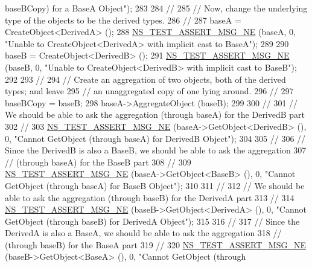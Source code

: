 \begin{DoxyCode}
{       baseBCopy) for a BaseA Object"});
283 
284   \textcolor{comment}{//}
285   \textcolor{comment}{// Now, change the underlying type of the objects to be the derived types.}
286   \textcolor{comment}{//}
287   baseA = CreateObject<DerivedA> ();
288   \hyperlink{group__testing_ga73d66fb0050a5111453fd144e767b91a}{NS\_TEST\_ASSERT\_MSG\_NE} (baseA, 0, \textcolor{stringliteral}{"Unable to CreateObject<DerivedA> with implicit
       cast to BaseA"});
289 
290   baseB = CreateObject<DerivedB> ();
291   \hyperlink{group__testing_ga73d66fb0050a5111453fd144e767b91a}{NS\_TEST\_ASSERT\_MSG\_NE} (baseB, 0, \textcolor{stringliteral}{"Unable to CreateObject<DerivedB> with implicit
       cast to BaseB"});
292 
293   \textcolor{comment}{//}
294   \textcolor{comment}{// Create an aggregation of two objects, both of the derived types; and leave}
295   \textcolor{comment}{// an unaggregated copy of one lying around.}
296   \textcolor{comment}{//}
297   baseBCopy = baseB;
298   baseA->AggregateObject (baseB);
299 
300   \textcolor{comment}{//}
301   \textcolor{comment}{// We should be able to ask the aggregation (through baseA) for the DerivedB part}
302   \textcolor{comment}{//}
303   \hyperlink{group__testing_ga73d66fb0050a5111453fd144e767b91a}{NS\_TEST\_ASSERT\_MSG\_NE} (baseA->GetObject<DerivedB> (), 0, \textcolor{stringliteral}{"Cannot GetObject (through
       baseA) for DerivedB Object"});
304 
305   \textcolor{comment}{//}
306   \textcolor{comment}{// Since the DerivedB is also a BaseB, we should be able to ask the aggregation }
307   \textcolor{comment}{// (through baseA) for the BaseB part}
308   \textcolor{comment}{//}
309   \hyperlink{group__testing_ga73d66fb0050a5111453fd144e767b91a}{NS\_TEST\_ASSERT\_MSG\_NE} (baseA->GetObject<BaseB> (), 0, \textcolor{stringliteral}{"Cannot GetObject (through
       baseA) for BaseB Object"});
310 
311   \textcolor{comment}{//}
312   \textcolor{comment}{// We should be able to ask the aggregation (through baseB) for the DerivedA part}
313   \textcolor{comment}{//}
314   \hyperlink{group__testing_ga73d66fb0050a5111453fd144e767b91a}{NS\_TEST\_ASSERT\_MSG\_NE} (baseB->GetObject<DerivedA> (), 0, \textcolor{stringliteral}{"Cannot GetObject (through
       baseB) for DerivedA Object"});
315 
316   \textcolor{comment}{//}
317   \textcolor{comment}{// Since the DerivedA is also a BaseA, we should be able to ask the aggregation }
318   \textcolor{comment}{// (through baseB) for the BaseA part}
319   \textcolor{comment}{//}
320   \hyperlink{group__testing_ga73d66fb0050a5111453fd144e767b91a}{NS\_TEST\_ASSERT\_MSG\_NE} (baseB->GetObject<BaseA> (), 0, \textcolor{stringliteral}{"Cannot GetObject (through
}
\end{DoxyCode}
